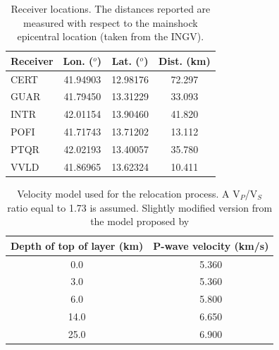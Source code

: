 \documentclass[a4paper,12pt]{article}
\begin{document}
\begin{table}
\renewcommand{\thetable}{S\arabic{table}}
\caption{Receiver locations. The distances reported are measured with respect to the mainshock epicentral location (taken from the INGV).}
\begin{center}
 \begin{tabular}{@{} l c c c}
   \hline
    Receiver  & Lon. ($^o$) & Lat. ($^o$) & Dist. (km) \\
    \hline
 CERT & 41.94903 & 12.98176 & 72.297 \\
 GUAR & 41.79450 & 13.31229 & 33.093 \\
 INTR & 42.01154 & 13.90460 & 41.820 \\    
 POFI & 41.71743 & 13.71202 & 13.112 \\
 PTQR & 42.02193 & 13.40057 & 35.780 \\
 VVLD & 41.86965 & 13.62324 & 10.411
 \end{tabular}
\end{center}
\label{tab:general_info}
\end{table}


\begin{table}
\renewcommand{\thetable}{S\arabic{table}}
 \caption{Velocity model used for the relocation process. A V$_P$/V$_S$ ratio equal to 1.73 is assumed. Slightly modified version from the model proposed by \cite{Bagh_2007_BSC}}
 \begin{center}
 \begin{tabular}{@{} c | c}
    \hline
    Depth of top of layer (km)	& P-wave velocity (km/s)  \\
    \hline
    0.0 & 5.360 \\
    3.0 & 5.360 \\
    6.0 & 5.800 \\
    14.0 & 6.650 \\
    25.0 & 6.900 
    \end{tabular}
 \label{tab:velocitymodel}
\end{center}
\end{table}
\end{document}
